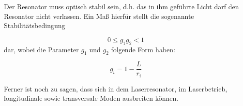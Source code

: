 Der Resonator muss optisch stabil sein, d.h. das in ihm geführte Licht darf den Resonator nicht verlassen. Ein Maß hierfür stellt
die sogenannte Stabilitätsbedingung

\begin{equation}
0 \leq g_1 g_2 < 1
\end{equation}
dar, wobei die Parameter $g_1$ und $g_2$ folgende Form haben:

\begin{equation}
g_i = 1 - \frac{L}{r_i}
\end{equation}


Ferner ist noch zu sagen, dass sich in dem Laserresonator, im Laserbetrieb, longitudinale sowie transversale Moden ausbreiten können.




